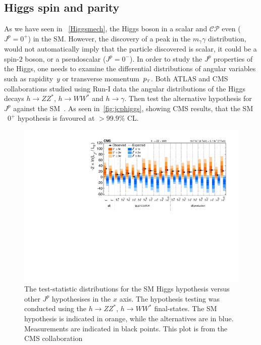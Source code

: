 \subsection{Higgs spin and parity \label{higgscp}}
As we have seen in ~\autoref{Higgsmech}, the Higgs boson in a scalar and $\mathcal{CP}$ even ($J^p= 0^+$) in the SM. However, the discovery of  a peak in the $m_\gamma \gamma$ distribution, would not automatically imply that the particle discovered is scalar, it could be a spin-$2$ boson, or a pseudoscalar  ($J^p= 0^-$). In order to study the $J^p$ properties of the Higgs, one needs to examine the differential distributions of angular variables such as rapidity~$y$ or transverse momentum~$p_{\scriptscriptstyle T}$. Both ATLAS and CMS collaborations studied using Run-I data the angular distributions of the Higgs decays $ h \to ZZ^*$, $h \to W W^*$ and $ h \to \gamma$. Then test the alternative hypothesis for $J^p$ against the SM~\cite{ATLAS:2015zhl,CMS:2014nkk}. As seen in~\autoref{fig:jcphiggs}, showing CMS results, that the SM ~$0^+$ hypothesis is favoured at $ >99.9\%$ CL.  
\begin{figure}[htb!]
	\begin{center}
		\includegraphics[width=1\textwidth]{figures/Higgs_results/CMS-HIG-14-018_Figure_018}
		\caption{The test-statistic distributions for the SM Higgs hypothesis versus other $J^p$ hypothesises in the $x$ axis. The hypothesis testing was conducted using the  $ h \to ZZ^*$, $h \to W W^*$  final-states. The SM hypothesis is indicated in orange, while the alternatives are in blue. Measurements are indicated in black points. This plot is from the CMS collaboration~\cite{CMS:2014nkk}}	
		\label{fig:jcphiggs}
	\end{center}
\end{figure}
